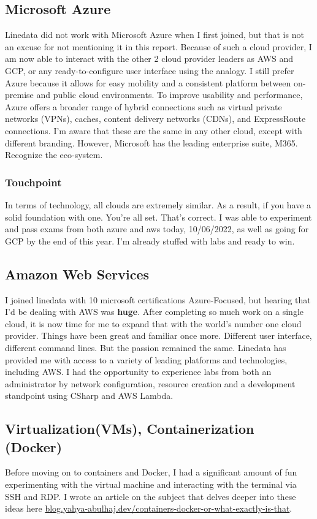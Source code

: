 \subsection{Microsoft Azure}
Linedata did not work with Microsoft Azure when I first joined, but that is not an excuse for not mentioning it in this report. Because of such a cloud provider, I am now able to interact with the other 2 cloud provider leaders as AWS and GCP, or any ready-to-configure user interface using the analogy. I still prefer Azure because it allows for easy mobility and a consistent platform between on-premise and public cloud environments. To improve usability and performance, Azure offers a broader range of hybrid connections such as virtual private networks (VPNs), caches, content delivery networks (CDNs), and ExpressRoute connections. I'm aware that these are the same in any other cloud, except with different branding. However, Microsoft has the leading enterprise suite, M365. Recognize the eco-system.
\subsubsection{Touchpoint}
In terms of technology, all clouds are extremely similar. As a result, if you have a solid foundation with one. You're all set. That's correct. I was able to experiment and pass exams from both azure and aws today, 10/06/2022, as well as going for GCP by the end of this year. I'm already stuffed with labs and ready to win.
\subsection{Amazon Web Services}

I joined linedata with 10 microsoft certifications Azure-Focused, but hearing that I'd be dealing with AWS was \textbf{huge}. After completing so much work on a single cloud, it is now time for me to expand that with the world's number one cloud provider. Things have been great and familiar once more. Different user interface, different command lines. But the passion remained the same.
Linedata has provided me with access to a variety of leading platforms and technologies, including AWS. I had the opportunity to experience labs from both an administrator by network configuration, resource creation and a development standpoint using CSharp and AWS Lambda.

\subsection{Virtualization(VMs), Containerization (Docker)}
Before moving on to containers and Docker, I had a significant amount of fun experimenting with the virtual machine and interacting with the terminal via SSH and RDP. I wrote an article on the subject that delves deeper into these ideas here \href{https://blog.yahya-abulhaj.dev/containers-docker-or-what-exactly-is-that}{blog.yahya-abulhaj.dev/containers-docker-or-what-exactly-is-that}.


